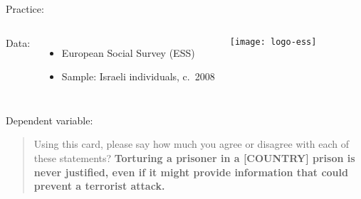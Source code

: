 \documentclass[t]{beamer}
\begin{document}

	\begin{frame}[t]{Practice: }

		\begin{columns}[c]

	    Data:\\[.5em]

			\begin{itemize}
				\item European Social Survey (ESS)
				\item Sample: Israeli individuals, c.~2008
			\end{itemize}


			\texttt{[image: logo-ess]}

		\end{columns}
		
			\vspace{.75em}
		
	    Dependent variable:\\[.5em]
		
			\begin{quote}
			  Using this card, please say how much you agree or disagree with each of these statements? \textbf{Torturing a prisoner in a [COUNTRY] prison is never justified, even if it might provide information that could prevent a terrorist attack.}%
			\end{quote}
	
	\end{frame}
	
\end{document}
